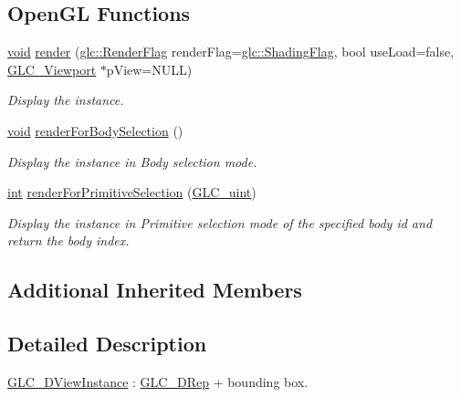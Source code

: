 \subsection*{Open\-G\-L Functions}
\begin{DoxyCompactItemize}
\item 
\hyperlink{group___u_a_v_objects_plugin_ga444cf2ff3f0ecbe028adce838d373f5c}{void} \hyperlink{class_g_l_c__3_d_view_instance_a344654d007e8c561f4110ef6f35447c3}{render} (\hyperlink{namespaceglc_a51a421b53283d5996142222b9baca26c}{glc\-::\-Render\-Flag} render\-Flag=\hyperlink{namespaceglc_a51a421b53283d5996142222b9baca26cad7fd33537da15e115a2d093f658d5e5f}{glc\-::\-Shading\-Flag}, bool use\-Load=false, \hyperlink{class_g_l_c___viewport}{G\-L\-C\-\_\-\-Viewport} $\ast$p\-View=N\-U\-L\-L)
\begin{DoxyCompactList}\small\item\em Display the instance. \end{DoxyCompactList}\item 
\hyperlink{group___u_a_v_objects_plugin_ga444cf2ff3f0ecbe028adce838d373f5c}{void} \hyperlink{class_g_l_c__3_d_view_instance_a1584eb6ac390e2da673fed0127c9c4c1}{render\-For\-Body\-Selection} ()
\begin{DoxyCompactList}\small\item\em Display the instance in Body selection mode. \end{DoxyCompactList}\item 
\hyperlink{ioapi_8h_a787fa3cf048117ba7123753c1e74fcd6}{int} \hyperlink{class_g_l_c__3_d_view_instance_a4b582d6b4ee30d1c858b5b67f6d0a994}{render\-For\-Primitive\-Selection} (\hyperlink{glc__global_8h_abf950976fabed69026558df8e2da6c6b}{G\-L\-C\-\_\-uint})
\begin{DoxyCompactList}\small\item\em Display the instance in Primitive selection mode of the specified body id and return the body index. \end{DoxyCompactList}\end{DoxyCompactItemize}
\subsection*{Additional Inherited Members}


\subsection{Detailed Description}
\hyperlink{class_g_l_c__3_d_view_instance}{G\-L\-C\-\_\-D\-View\-Instance} \-: \hyperlink{class_g_l_c__3_d_rep}{G\-L\-C\-\_\-D\-Rep} + bounding box. 

